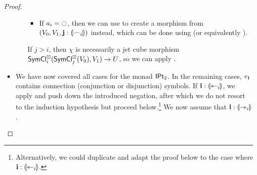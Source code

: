 \documentclass[a4paper]{memoir}
\begin{document}
\begin{proof}
\begin{itemize}
\begin{itemize}
\begin{itemize}
				
				\item If $a_i = \npolar$, then we can use  to create a morphism from $(V_0, V_1, \mathbf{j} : {\llparenthesis \frown_i \rrparenthesis})$ instead, which can be done using  (or equivalently ).
			\end{itemize}
			
			If $j > i$, then $\chi$ is necessarily a jet cube morphism $\mathsf{SymCl}^\boxdot_i(\mathsf{SymCl}^\boxdot_j(V_0), V_1) \to U$, so we can apply .
		\end{itemize}
		
		\item We have now covered all cases for the monad ${\mathsf{IPt}_2}$.
		In the remaining cases, $e_{\mathbf{i}}$ contains connection (conjunction or disjunction) symbols.
		If $\mathbf{i} : {\llparenthesis \leftarrowtriangle_i \rrparenthesis}$, we apply  and push down the introduced negation, after which we do not resort to the induction hypothesis but proceed below.\footnote{Alternatively, we could duplicate and adapt the proof below to the case where $\mathbf{i} : {\llparenthesis \leftarrowtriangle_i \rrparenthesis}$.}
		We now assume that $\mathbf{i} : {\llparenthesis \rightarrowtriangle_i \rrparenthesis}$.
		

\end{itemize}
\end{proof}
\end{document}
